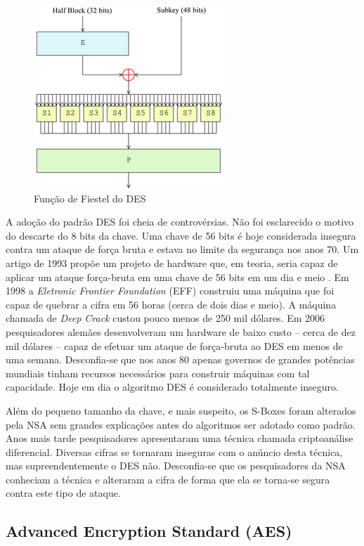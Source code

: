 \begin{figure}[!htp]
  \centering
  \includegraphics[width=.4\textwidth]{imagens/feistel-function.png}
  \caption{Função de Fiestel do DES}
  \label{fig:feistel-function}
\end{figure}


A adoção do padrão DES foi cheia de controvérsias.
Não foi esclarecido o motivo do descarte do 8 bits da chave.
Uma chave de 56 bits é hoje considerada insegura contra um ataque de força bruta e estava no limite da segurança nos anos 70.
Um artigo de 1993 propõe um projeto de hardware que, em teoria, seria capaz de aplicar um ataque força-bruta em uma chave de 56 bits em um dia e meio \cite{}.
Em 1998 a {\em Eletronic Frontier Foundation} (EFF) construiu uma máquina que foi capaz de quebrar a cifra em 56 horas (cerca de dois dias e meio).
A máquina chamada de {\em Deep Crack} custou pouco menos de 250 mil dólares.
Em 2006 pesquisadores alemães desenvolveram um hardware de baixo custo -- cerca de dez mil dólares -- capaz de efetuar um ataque de força-bruta ao DES em menos de uma semana.
Desconfia-se que nos anos 80 apenas governos de grandes potências mundiais tinham recursos necessários para construir máquinas com tal capacidade.
Hoje em dia o algoritmo DES é considerado totalmente inseguro.

Além do pequeno tamanho da chave, e mais suspeito, os S-Boxes foram alterados pela NSA sem grandes explicações antes do algoritmos ser adotado como padrão.
Anos mais tarde pesquisadores apresentaram uma técnica chamada criptoanálise diferencial.
Diversas cifras se tornaram inseguras com o anúncio desta técnica, mas supreendentemente o DES não.
Desconfia-se que os pesquisadores da NSA conheciam a técnica e alteraram a cifra de forma que ela se torna-se segura contra este tipo de ataque.

\subsection{Advanced Encryption Standard (AES)}
\label{sec:aes}

